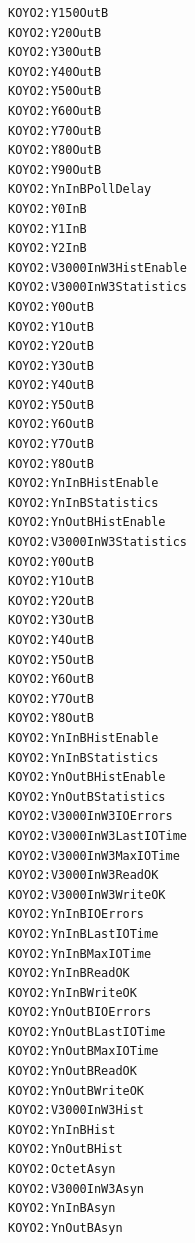 \documentclass[11pt
  , a4paper
  , article
  , oneside
]{memoir}
\begin{document}
\begin{lstlisting}[style=termstyle]
KOYO2:Y150OutB
KOYO2:Y20OutB
KOYO2:Y30OutB
KOYO2:Y40OutB
KOYO2:Y50OutB
KOYO2:Y60OutB
KOYO2:Y70OutB
KOYO2:Y80OutB
KOYO2:Y90OutB
KOYO2:YnInBPollDelay
KOYO2:Y0InB
KOYO2:Y1InB
KOYO2:Y2InB
KOYO2:V3000InW3HistEnable
KOYO2:V3000InW3Statistics
KOYO2:Y0OutB
KOYO2:Y1OutB
KOYO2:Y2OutB
KOYO2:Y3OutB
KOYO2:Y4OutB
KOYO2:Y5OutB
KOYO2:Y6OutB
KOYO2:Y7OutB
KOYO2:Y8OutB
KOYO2:YnInBHistEnable
KOYO2:YnInBStatistics
KOYO2:YnOutBHistEnable
KOYO2:V3000InW3Statistics
KOYO2:Y0OutB
KOYO2:Y1OutB
KOYO2:Y2OutB
KOYO2:Y3OutB
KOYO2:Y4OutB
KOYO2:Y5OutB
KOYO2:Y6OutB
KOYO2:Y7OutB
KOYO2:Y8OutB
KOYO2:YnInBHistEnable
KOYO2:YnInBStatistics
KOYO2:YnOutBHistEnable
KOYO2:YnOutBStatistics
KOYO2:V3000InW3IOErrors
KOYO2:V3000InW3LastIOTime
KOYO2:V3000InW3MaxIOTime
KOYO2:V3000InW3ReadOK
KOYO2:V3000InW3WriteOK
KOYO2:YnInBIOErrors
KOYO2:YnInBLastIOTime
KOYO2:YnInBMaxIOTime
KOYO2:YnInBReadOK
KOYO2:YnInBWriteOK
KOYO2:YnOutBIOErrors
KOYO2:YnOutBLastIOTime
KOYO2:YnOutBMaxIOTime
KOYO2:YnOutBReadOK
KOYO2:YnOutBWriteOK
KOYO2:V3000InW3Hist
KOYO2:YnInBHist
KOYO2:YnOutBHist
KOYO2:OctetAsyn
KOYO2:V3000InW3Asyn
KOYO2:YnInBAsyn
KOYO2:YnOutBAsyn
\end{lstlisting}
\end{document}
